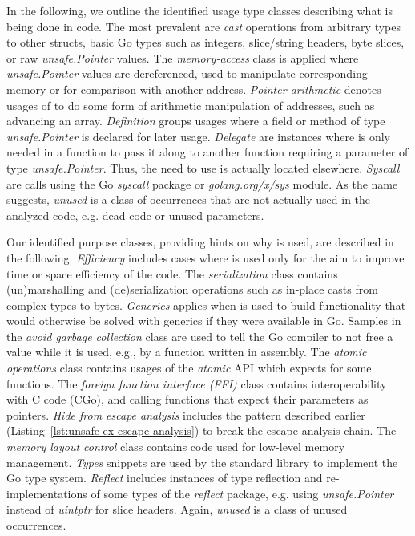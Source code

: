In the following, we outline the identified usage type classes describing what is being done in code.
The most prevalent are \textit{cast} operations from arbitrary types to other structs, basic Go types such as integers, slice/string headers, byte slices, or raw \textit{unsafe.Pointer} values. 
The \textit{memory-access} class is applied where \textit{unsafe.Pointer} values are dereferenced, used to manipulate corresponding memory or for comparison with another address.
\textit{Pointer-arithmetic} denotes usages of \unsafe{} to do some form of arithmetic manipulation of addresses, such as advancing an array.
\textit{Definition} groups usages where a field or method of type \textit{unsafe.Pointer} is declared for later usage.
\textit{Delegate} are instances where \unsafe{} is only needed in a function to pass it along to another function requiring a parameter of type \textit{unsafe.Pointer}. 
Thus, the need to use \unsafe{} is actually located elsewhere.
\textit{Syscall} are calls using the Go \textit{syscall} package or \textit{golang.org/x/sys} module.
As the name suggests, \textit{unused} is a class of occurrences that are not actually used in the analyzed code, e.g. dead code or unused parameters.

Our identified purpose classes, providing hints on why \unsafe{} is used, are described in the following.
\textit{Efficiency} includes cases where \unsafe{} is used only for the aim to improve time or space efficiency of the code.
The \textit{serialization} class contains (un)marshalling and (de)serialization operations such as in-place casts from complex types to bytes.
\textit{Generics} applies when \unsafe{} is used to build functionality that would otherwise be solved with generics if they were available in Go.
Samples in the \textit{avoid garbage collection} class are used to tell the Go compiler to not free a value while it is used, e.g., by a function written in assembly.
The \textit{atomic operations} class contains usages of the \textit{atomic} API which expects \unsafe{} for some functions.
The \textit{foreign function interface (FFI)} class contains interoperability with C code (CGo), and calling  functions that expect their parameters as \unsafe{} pointers.
\textit{Hide from escape analysis} includes the pattern described earlier (Listing~\ref{lst:unsafe-ex-escape-analysis}) to break the escape analysis chain.
The \textit{memory layout control} class contains code used for low-level memory management.
\textit{Types} snippets are used by the standard library to implement the Go type system.
\textit{Reflect} includes instances of type reflection and re-implementations of some types of the \textit{reflect} package, e.g. using \textit{unsafe.Pointer} instead of \textit{uintptr} for slice headers.
Again, \textit{unused} is a class of unused occurrences.

